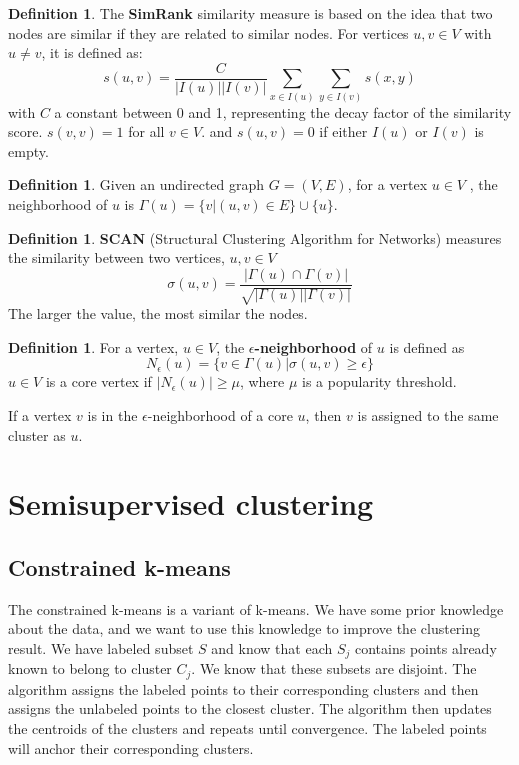 \documentclass[12pt, openany]{report}
\theoremstyle{definition}
\newtheorem{definition}[thm]{Definition}
\begin{document}
\begin{definition}
    The \textbf{SimRank} similarity measure is based on the idea that two nodes are similar if they are related to similar nodes. For vertices $u,v \in V$ with $u \neq v$, it is defined as:
    \begin{equation}
    s(u, v) = \frac{C}{|I(u)| |I(v)|} \sum_{x \in I(u)} \sum_{y \in I(v)}s(x, y)
    \end{equation}
    with $C$ a constant between 0 and 1, representing the decay factor of the similarity score. $s(v,v) =1$ for all $v \in V$. and $s(u,v) = 0$ if either $I(u)$ or $I(v)$ is empty.
\end{definition}
\begin{definition}
    Given an undirected graph $G = (V , E )$, for a vertex $u \in V$ , the neighborhood of $u$ is $\Gamma(u) = \{v |(u, v ) \in E \} \cup \{u\}$.
\end{definition}
\begin{definition}
    \textbf{SCAN} (Structural Clustering Algorithm for Networks) measures the similarity between two vertices, $u, v \in V$
    \begin{equation}
        \sigma(u, v) = \frac{|\Gamma(u) \cap \Gamma(v)|}{\sqrt{|\Gamma(u)| |\Gamma(v)|}}
    \end{equation}
    The larger the value, the most similar the nodes.
\end{definition}
\begin{definition}
    For a vertex, $u \in V$, the \textbf{$\epsilon$-neighborhood} of $u$ is defined as
    \begin{equation}
        N_\epsilon(u) = \{v \in \Gamma(u) | \sigma(u, v) \geq \epsilon\}
    \end{equation}
    $u \in V$ is a core vertex if $|N_\epsilon(u)| \geq \mu$, where $\mu$ is a popularity threshold.
\end{definition}
If a vertex $v$ is in the $\epsilon$-neighborhood of a core $u$, then $v$ is assigned to the same cluster as $u$. 
\section{Semisupervised clustering}
\subsection{Constrained k-means}
The constrained k-means is a variant of k-means. We have some prior knowledge about the data, and we want to use this knowledge to improve the clustering result. We have labeled subset $S$ and know that each $S_j$ contains points already known to belong to cluster $C_j$. We know that these subsets are disjoint. The algorithm assigns the labeled points to their corresponding clusters and then assigns the unlabeled points to the closest cluster. The algorithm then updates the centroids of the clusters and repeats until convergence. The labeled points will anchor their corresponding clusters.
\end{document}
